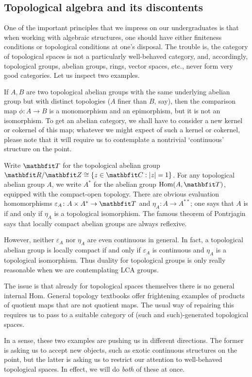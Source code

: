 \subsection*{Topological algebra and its discontents}

One of the important principles that we impress on our undergraduates is that when working with algebraic structures, one should have either finiteness conditions or topological conditions at one's disposal.
The trouble is, the category of topological spaces is not a particularly well-behaved category, and, accordingly, topological groups, abelian groups, rings, vector spaces, etc., never form very good categories.
Let us inspect two examples.

\begin{exm*}
	If $ A, B $ are two topological abelian groups with the same underlying abelian group but with distinct topologies ($ A $ finer than $ B $, say), then the comparison map $ \phi \colon A \to B $ is a monomorphism and an epimorphism, but it is not an isomorphism.
	To get an abelian category, we shall have to consider a new kernel or cokernel of this map;
	whatever we might expect of such a kernel or cokernel, please note that it will require us to contemplate a nontrivial `continuous' structure on the point.
\end{exm*}

\begin{exm*}
	Write $ \TT $ for the topological abelian group $ \RR/\ZZ \cong \{ z \in \CC : |z| = 1 \} $.
	For any topological abelian group $ A $, we write $ A^{\ast} $ for the  abelian group $ \Hom(A, \TT) $, equipped with the compact-open topology.
	There are obvious evaluation homomorphisms $ \varepsilon_A \colon A \times A^{\ast} \to \TT $ and $ \eta_A \colon A \to A^{\ast\ast} $;
	one says that $ A $ is  if and only if $ \eta_A $ is a topological isomorphism.
	The famous theorem of Pontrjagin says that locally compact abelian groups are always reflexive.

	However, neither $ \varepsilon_A $ nor $ \eta_A $ are even continuous in general.
	In fact, a topological abelian group is locally compact if and only if $ \varepsilon_A $ is continuous and $ \eta_A $ is a topological isomorphism.
	Thus duality for topological groups is only really reasonable when we are contemplating LCA groups.

	The issue is that already for topological spaces themselves there is no general internal Hom.
	General topology textbooks offer frightening examples of products of quotient maps that are not quotient maps.
	The usual way of repairing this requires us to pass to a suitable category of (such and such)-generated topological spaces.
\end{exm*}

In a sense, these two examples are pushing us in different directions.
The former is asking us to accept new objects, such as exotic continuous structures on the point,
but the latter is asking us to restrict our attention to well-behaved topological spaces.
In effect, we will do \emph{both} of these at once.


